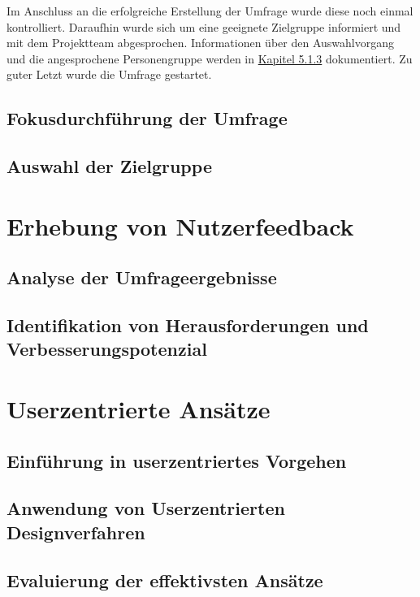 Im Anschluss an die erfolgreiche Erstellung der Umfrage wurde diese noch einmal kontrolliert.
Daraufhin wurde sich um eine geeignete Zielgruppe informiert und mit dem Projektteam abgesprochen.
Informationen über den Auswahlvorgang und die angesprochene Personengruppe werden in \hyperref[subsec:auswahl-der-zielgruppe]{Kapitel 5.1.3} dokumentiert.
Zu guter Letzt wurde die Umfrage gestartet.

\subsection{Fokusdurchführung der Umfrage}

\subsection{Auswahl der Zielgruppe}
\label{subsec:auswahl-der-zielgruppe}

\section{Erhebung von Nutzerfeedback}

\subsection{Analyse der Umfrageergebnisse}

\subsection{Identifikation von Herausforderungen und Verbesserungspotenzial}

\section{Userzentrierte Ansätze}

\subsection{Einführung in userzentriertes Vorgehen}

\subsection{Anwendung von Userzentrierten Designverfahren}

\subsection{Evaluierung der effektivsten Ansätze}

